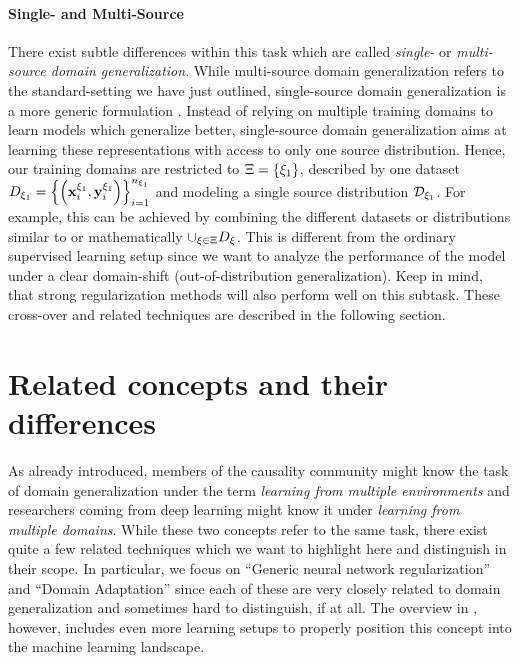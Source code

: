 \paragraph{Single- and Multi-Source}
There exist subtle differences within this task which are called \emph{single-} or \emph{multi-source domain generalization}. While multi-source domain generalization refers to the standard-setting we have just outlined, single-source domain generalization is a more generic formulation \citep{zunino2020explainable}. Instead of relying on multiple training domains to learn models which generalize better, single-source domain generalization aims at learning these representations with access to only one source distribution. Hence, our training domains are restricted to $\Xi = \left\{\xi_1\right\}$, described by one dataset $D_{\xi_1}=\left\{\left(\mathbf{x}_i^{\xi_1}, \mathbf{y}_i^{\xi_1}\right)\right\}_{i=1}^{n_{\xi_1}}$ and modeling a single source distribution $\mathcal{D}_{\xi_1}$. For example, this can be achieved by combining the different datasets or distributions similar to  or mathematically $\cup_{\xi \in \Xi} D_\xi$. This is different from the ordinary supervised learning setup since we want to analyze the performance of the model under a clear domain-shift (\ie out-of-distribution generalization). Keep in mind, that strong regularization methods will also perform well on this subtask. These cross-over and related techniques are described in the following section.

\section{Related concepts and their differences}

As already introduced, members of the causality community might know the task of domain generalization under the term \emph{learning from multiple environments} \citep{arjovsky2019invariant, gulrajani2020search, PetBuhMei15} and researchers coming from deep learning might know it under \emph{learning from multiple domains}. While these two concepts refer to the same task, there exist quite a few related techniques which we want to highlight here and distinguish in their scope. In particular, we focus on ``Generic neural network regularization'' and ``Domain Adaptation'' since each of these are very closely related to domain generalization and sometimes hard to distinguish, if at all. The overview in , however, includes even more learning setups to properly position this concept into the machine learning landscape.

